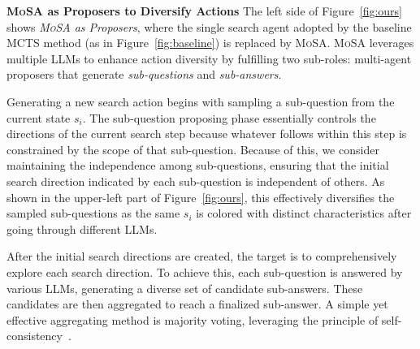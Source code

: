 

\textbf{\textsc{MoSA} as Proposers to Diversify Actions}
\hspace{5pt}
The left side of Figure~\ref{fig:ours} shows \emph{\textsc{MoSA} as Proposers}, where the single search agent adopted by the baseline MCTS method (as in Figure~\ref{fig:baseline}) is replaced by \textsc{MoSA}. 
\textsc{MoSA} leverages multiple LLMs to enhance action diversity by fulfilling two sub-roles: multi-agent proposers that generate \emph{sub-questions} and \emph{sub-answers}.

Generating a new search action begins with sampling a sub-question from the current state $s_i$. 
The sub-question proposing phase essentially controls the directions of the current search step because whatever follows within this step is constrained by the scope of that sub-question. 
Because of this, we consider maintaining the independence among sub-questions, ensuring that the initial search direction indicated by each sub-question is independent of others. 
As shown in the upper-left part of Figure~\ref{fig:ours}, this effectively diversifies the sampled sub-questions as the same $s_i$ is colored with distinct characteristics after going through different LLMs.

After the initial search directions are created, the target is to comprehensively explore each search direction. 
To achieve this, each sub-question is answered by various LLMs, generating a diverse set of candidate sub-answers. 
These candidates are then aggregated to reach a finalized sub-answer.
A simple yet effective aggregating method is majority voting, leveraging the principle of self-consistency~\cite{wang2023selfconsistency}.



